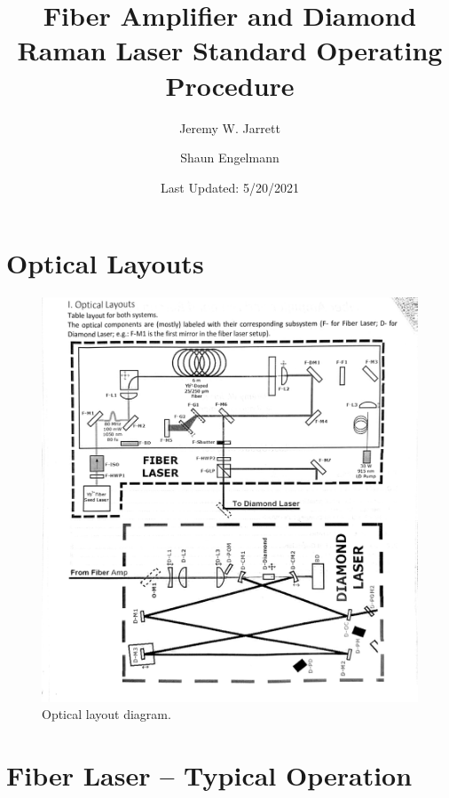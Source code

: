 \documentclass{article}
\title{Fiber Amplifier and Diamond Raman Laser Standard Operating Procedure}
\author{Jeremy W. Jarrett \and Shaun Engelmann}
\date{Last Updated: 5/20/2021}
\begin{document}
\maketitle
\tableofcontents
\newpage

\section{Optical Layouts}
\begin{figure}[ht]
  \centering
  \includegraphics[width=0.9\linewidth]{optical_layout.png}
  \caption{Optical layout diagram.}
\end{figure}

\section{Fiber Laser -- Typical Operation}
\end{document}
